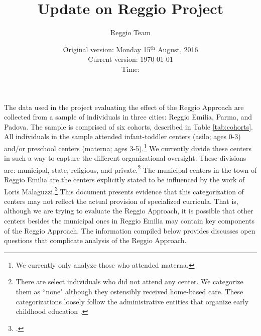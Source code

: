 \documentclass[12pt]{article}
\begin{document}
\title{Update on Reggio Project}
\author{Reggio Team}
\date{Original version: Monday 15$^{\text{th}}$ August, 2016 \\ Current version: \today \\ \vspace{1em} Time: \currenttime}
\maketitle

\doublespace

The data used in the project evaluating the effect of the Reggio Approach are collected from a sample of individuals in three cities: Reggio Emilia, Parma, and Padova. The sample is comprised of six cohorts, described in Table \ref{tab:cohorts}. All individuals in the sample attended infant-toddler centers (asilo; ages 0-3) and/or preschool centers (materna; ages 3-5).\footnote{We currently only analyze those who attended materna.} We currently divide these centers in such a way to capture the different organizational oversight. These divisions are: municipal, state, religious, and private.\footnote{There are select individuals who did not attend any center. We categorize them as ``none" although they ostensibly received home-based care. These categorizations loosely follow the administrative entities that organize early childhood education \citet{della2001early}.} The municipal centers in the town of Reggio Emilia are the centers explicitly stated to be influenced by the work of Loris Malaguzzi.\footnote{\citet{Cagliari-etal-eds_2016_BOOK_Loris-Malaguzzi}.} This document presents evidence that this categorization of centers may not reflect the actual provision of specialized curricula. That is, although we are trying to evaluate the Reggio Approach, it is possible that other centers besides the municipal ones in Reggio Emilia may contain key components of the Reggio Approach. The information compiled below provides discusses open questions that complicate analysis of the Reggio Approach.
\end{document}
